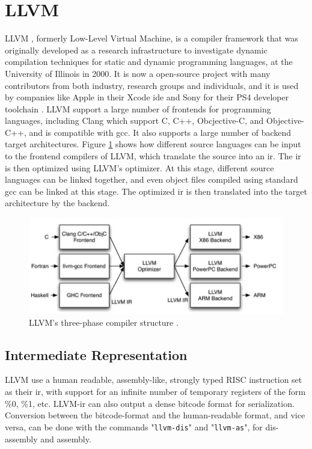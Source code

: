 \section{\label{sec:LLVM}LLVM}
LLVM \cite{LLVM:CGO04}, formerly Low-Level Virtual Machine, is a compiler framework that was originally developed as a research infrastructure to investigate dynamic compilation techniques for static and dynamic programming languages, at the University of Illinois in 2000. It is now a open-source project with many contributors from both industry, research groups and individuals, and it is used by companies like Apple in their Xcode \gls{ide} \cite{llvmapple} and Sony for their PS4 developer toolchain \cite{llvmsony}. LLVM support a large number of frontends for programming languages, including Clang \cite{clang} which support C, C++, Obcjective-C, and Objective-C++, and is compatible with \gls{gcc}. It also supports a large number of backend target architectures. Figure \ref{fig:llvmcompiler} shows how different source languages can be input to the frontend compilers of LLVM, which translate the source into an \gls{ir}. The \gls{ir} is then optimized using LLVM's optimizer. At this stage, different source languages can be linked together, and even object files compiled using standard \gls{gcc} can be linked at this stage. The optimized \gls{ir} is then translated into the target architecture by the backend.

\begin{figure}[hbpt]
\centering
\includegraphics[width=\textwidth]{../figs/LLVMCompiler.jpg}
\caption{\label{fig:llvmcompiler}LLVM's three-phase compiler structure \cite{llvmarch}.}
\end{figure}

\subsection{Intermediate Representation}
LLVM use a human readable, assembly-like, strongly typed RISC instruction set as their \gls{ir}, with support for an infinite number of temporary registers of the form \%0, \%1, etc. LLVM-\gls{ir} can also output a dense bitcode format for serialization. Conversion between the bitcode-format and the human-readable format, and vice versa, can be done with the commands "\verb!llvm-dis!" and "\verb!llvm-as!", for dis-assembly and assembly.

